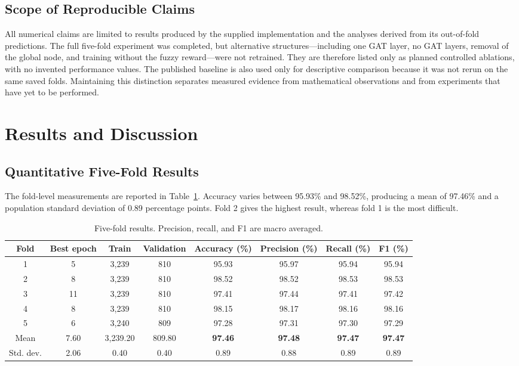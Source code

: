 \documentclass[10pt,conference]{IEEEtran}
\begin{document}
\subsection{Scope of Reproducible Claims}
All numerical claims are limited to results produced by the supplied implementation and the analyses derived from its out-of-fold predictions. The full five-fold experiment was completed, but alternative structures---including one GAT layer, no GAT layers, removal of the global node, and training without the fuzzy reward---were not retrained. They are therefore listed only as planned controlled ablations, with no invented performance values. The published baseline is also used only for descriptive comparison because it was not rerun on the same saved folds. Maintaining this distinction separates measured evidence from mathematical observations and from experiments that have yet to be performed.

\section{Results and Discussion}

\subsection{Quantitative Five-Fold Results}

The fold-level measurements are reported in Table~\ref{tab:foldresults}. Accuracy varies between 95.93\% and 98.52\%, producing a mean of 97.46\% and a population standard deviation of 0.89 percentage points. Fold 2 gives the highest result, whereas fold 1 is the most difficult.

\begin{table}[!t]
\caption{Five-fold results. Precision, recall, and F1 are macro averaged.}
\label{tab:foldresults}
\centering
\footnotesize
\setlength{\tabcolsep}{4pt}
\begin{tabular}{cccccccc}
\toprule
Fold & Best epoch & Train & Validation & Accuracy (\%) & Precision (\%) & Recall (\%) & F1 (\%)\\
\midrule
1 & 5  & 3,239 & 810 & 95.93 & 95.97 & 95.94 & 95.94\\
2 & 8  & 3,239 & 810 & 98.52 & 98.52 & 98.53 & 98.53\\
3 & 11 & 3,239 & 810 & 97.41 & 97.44 & 97.41 & 97.42\\
4 & 8  & 3,239 & 810 & 98.15 & 98.17 & 98.16 & 98.16\\
5 & 6  & 3,240 & 809 & 97.28 & 97.31 & 97.30 & 97.29\\
\midrule
Mean & 7.60 & 3,239.20 & 809.80 & \textbf{97.46} & \textbf{97.48} & \textbf{97.47} & \textbf{97.47}\\
Std. dev. & 2.06 & 0.40 & 0.40 & 0.89 & 0.88 & 0.89 & 0.89\\
\bottomrule
\end{tabular}
\end{table}
\end{document}
